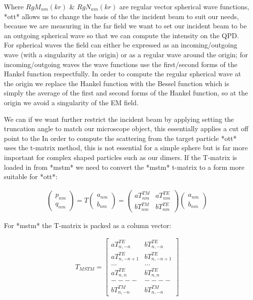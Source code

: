 Where $RgM_{nm}(kr)$ \& $RgN_{nm}(kr)$ are regular vector spherical wave functions, *ott* allows us to change the basis of the the incident beam to suit our needs, because we are measuring in the far field we want to set our incident beam to be an outgoing spherical wave so that we can compute the intensity on the QPD. For spherical waves the field can either be expressed as an incoming/outgoing wave (with a singularity at the origin) or as a regular wave around the origin; for incoming/outgoing waves the wave functions use the first/second forms of the Hankel function respectfully. In order to compute the regular spherical wave at the origin we replace the Hankel function with the Bessel function which is simply the average of the first and second forms of the Hankel function, so at the origin we avoid a singularity of the EM field.  

We can if we want further restrict the incident beam by applying setting the truncation angle to match our microscope object, this essentially applies a cut off point to the In order to compute the scattering from the target particle *ott* uses the t-matrix method, this is not essential for a simple sphere but is far more important for complex shaped particles such as our dimers. If the T-matrix is loaded in from *mstm* we need to convert the *mstm* t-matrix to a form more suitable for *ott*:

\begin{align}
	\begin{pmatrix}
		p_{nm}\\
		q_{nm}
	\end{pmatrix} =T 
	\begin{pmatrix}
		a_{nm}\\
		b_{nm}
	\end{pmatrix} = 
	\begin{pmatrix}
		aT^{TM}_{nm} & aT^{TE}_{nm}\\ 
		bT^{TM}_{nm} & bT^{TE}_{nm}
	\end{pmatrix}
	\begin{pmatrix}
		a_{nm}\\
		b_{nm}
	\end{pmatrix}
\end{align} 

For *mstm* the T-matrix is packed as a column vector:

\begin{align}
	T_{MSTM} = 
	\begin{bmatrix} 
		aT^{TE}_{n,-n} & bT^{TE}_{n,-n} \\ 
		aT^{TE}_{n, -n+1} & bT^{TE}_{n, -n+1} \\ 
		... & ...\\ 
		aT^{TE}_{n,n} & bT^{TE}_{n,n} \\ 
		----&----\\ 
		bT^{TM}_{n,-n} &bT^{TM}_{n,-n} 
	\end{bmatrix}
\end{align}

